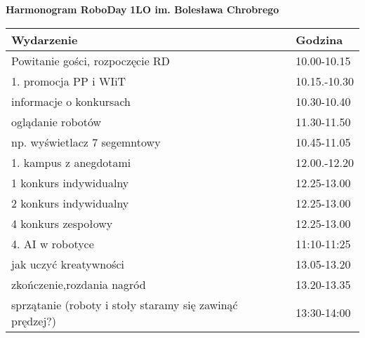\documentclass{article}
\begin{document}
\begin{center}
\Large\textbf{Harmonogram RoboDay}
\large\textbf{1LO im. Bolesława Chrobrego}
\end{center}
\vspace{1cm}
\begin{center}
\begin{tabular}{|l|l|}
\hline
\textbf{Wydarzenie} & \textbf{Godzina} \\
\hline
Powitanie gości, rozpoczęcie RD & 10.00-10.15 \\
\hline
1. promocja PP i WIiT & 10.15.-10.30 \\
\hline
informacje o konkursach & 10.30-10.40 \\
\hline
oglądanie robotów & 11.30-11.50 \\
\hline
np. wyświetlacz 7 segemntowy & 10.45-11.05 \\
\hline
1. kampus z anegdotami & 12.00.-12.20 \\
\hline
1 konkurs indywidualny & 12.25-13.00 \\
\hline
2 konkurs indywidualny & 12.25-13.00 \\
\hline
4 konkurs zespołowy & 12.25-13.00 \\
\hline
4. AI w robotyce & 11:10-11:25 \\
\hline
jak uczyć kreatywności & 13.05-13.20 \\
\hline
zkończenie,rozdania nagród & 13.20-13.35 \\
\hline
sprzątanie (roboty i stoły staramy się zawinąć prędzej?) & 13:30-14:00 \\
\hline
\end{tabular}
\end{center}
\end{document}

